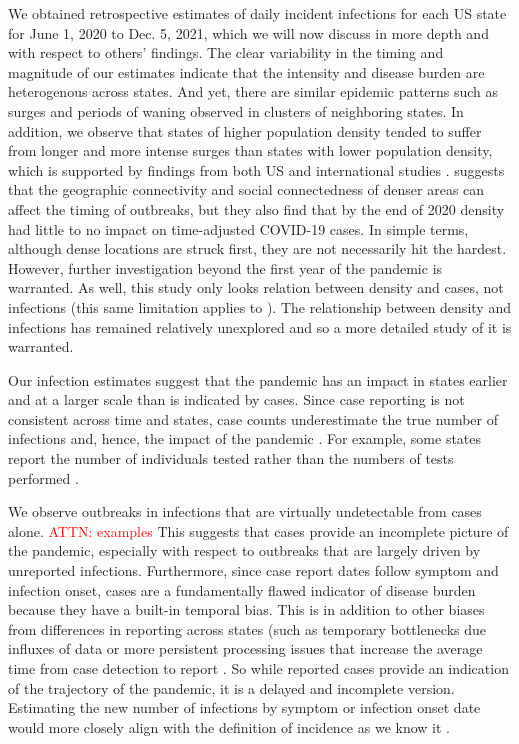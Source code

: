 \documentclass{article}
\newcommand{\attn }[1]{\textcolor{red}{ATTN: #1}}
\begin{document}
We obtained retrospective estimates of daily incident infections for each US
state for June 1, 2020 to Dec. 5, 2021, which we will now discuss in more depth
and with respect to others' findings. The clear variability in the timing and
magnitude of our estimates indicate that the intensity and disease burden are
heterogenous across states. And yet, there are similar epidemic patterns such as
surges and periods of waning observed in clusters of neighboring states. In
addition, we observe that states of higher population density tended to suffer
from longer and more intense surges than states with lower population density,
which is supported by findings from both US and international studies
\citep{carozzi2022urban, iderus2022correlation, wong2020spreading}.
\citet{carozzi2022urban} suggests that the geographic connectivity and social
connectedness of denser areas can affect the timing of outbreaks, but they also
find that by the end of 2020 density had little to no impact on time-adjusted
COVID-19 cases. In simple terms, although dense locations are struck first, they
are not necessarily hit the hardest. However, further investigation beyond the
first year of the pandemic is warranted. As well, this study only looks relation
between density and cases, not infections (this same limitation applies to
\citet{jalal2021prominent}). The relationship between density and infections has
remained relatively unexplored and so a more detailed study of it is
warranted.

Our infection estimates suggest that the pandemic has an impact
in states earlier and at a larger scale than is indicated by cases. Since
case reporting is not consistent across time and states, case counts
underestimate the true number of infections and, hence, the impact of the
pandemic \citep{cdc2022estimated, simon2022inconsistent}. For example, some
states report the number of individuals tested rather than the numbers of tests
performed \citep{schechtman2020counting, chitwood2021reconstructing}.

We observe outbreaks in infections that are virtually undetectable from cases
alone. \attn {examples} This suggests that cases provide an incomplete picture 
of the pandemic, especially with respect to outbreaks that are largely driven by 
unreported infections. Furthermore, since case report dates follow symptom and infection
onset, cases are a fundamentally flawed indicator of disease burden because they
have a built-in temporal bias. This is in addition to other biases from
differences in reporting across states (such as temporary bottlenecks due
influxes of data or more persistent processing issues that increase the average
time from case detection to report \citep{wash2020dash, dunkel2020covid19}. So
while reported cases provide an indication of the trajectory of the pandemic, it
is a delayed and incomplete version. Estimating the new number of infections by
symptom or infection onset date would more closely align with the definition of
incidence as we know it \citep{jahja2022real}.
\end{document}
